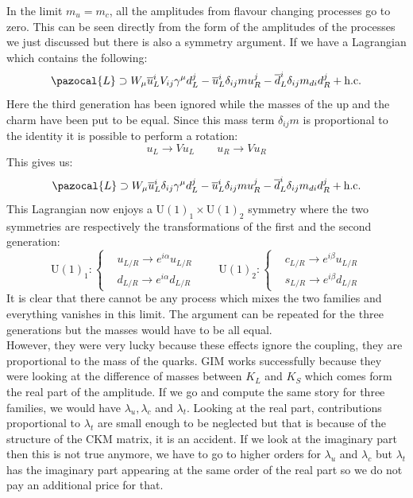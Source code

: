 \documentclass[../main.tex]{subfiles}
\begin{document}
In the limit $m_u=m_c$, all the amplitudes from flavour changing processes go to zero. This can be seen directly from the form of the amplitudes of the processes we just discussed but there is also a symmetry argument. If we have a Lagrangian which contains the following:
\[
\pazocal{L}\supset W_\mu\overline{u}_L^iV_{ij}\gamma^\mu d_L^j-\overline{u}_L^i\delta_{ij}mu_R^j-\overline{d}_L^i\delta_{ij}m_{di}d_R^j+\text{h.c.}
\]
Here the third generation has been ignored while the masses of the up and the charm have been put to be equal. Since this mass term $\delta_{ij}m$ is proportional to the identity it is possible to perform a rotation:
\[
u_L\to Vu_L \qquad u_R\to Vu_R
\]
This gives us:
\[
\pazocal{L}\supset W_\mu\overline{u}_L^i\delta_{ij}\gamma^\mu d_L^j-\overline{u}_L^i\delta_{ij}mu_R^j-\overline{d}_L^i\delta_{ij}m_{di}d_R^j+\text{h.c.}
\]
This Lagrangian now enjoys a U$(1)_1\times$U$(1)_2$ symmetry where the two symmetries are respectively the transformations of the first and the second generation:
\[
\text{U}(1)_1:\left\{
\begin{aligned}
&u_{L/R}\to e^{i\alpha}u _{L/R}\\
&d_{L/R}\to e^{i\alpha}d_{L/R}
\end{aligned}
\right.
\qquad
\text{U}(1)_2:\left\{
\begin{aligned}
&c_{L/R}\to e^{i\beta}u _{L/R}\\
&s_{L/R}\to e^{i\beta}d_{L/R}
\end{aligned}
\right.
\]
It is clear that there cannot be any process which mixes the two families and everything vanishes in this limit. The argument can be repeated for the three generations but the masses would have to be all equal.\\
However, they were very lucky because these effects ignore the coupling, they are proportional to the mass of the quarks. GIM works successfully because they were looking at the difference of masses between $K_L$ and $K_S$ which comes form the real part of the amplitude. If we go and compute the same story for three families, we would have $\lambda_u, \lambda_c$ and $\lambda_t$. Looking at the real part, contributions proportional to $\lambda_t$ are small enough to be neglected but that is because of the structure of the CKM matrix, it is an accident. If we look at the imaginary part then this is not true anymore, we have to go to higher orders for $\lambda_u$ and $\lambda_c$ but $\lambda_t$ has the imaginary part appearing at the same order of the real part so we do not pay an additional price for that.\\
\end{document}
